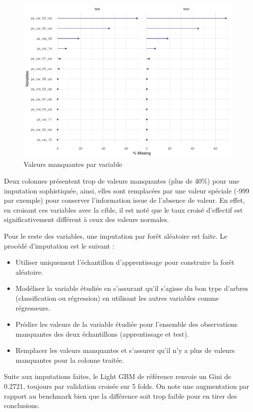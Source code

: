 \documentclass[french]{article}
\begin{document}
\begin{multicols}{2}
\begin{figure}[H] \centering
  \includegraphics[width = \columnwidth]{img/missing_values}
  \caption{Valeurs manquantes par variable}
\end{figure}


Deux colonnes présentent trop de valeurs manquantes (plus de 40\%) pour une imputation sophistiquée, ainsi, elles sont remplacées par une valeur spéciale (-999 par exemple) pour conserver l'information issue de l'absence de valeur. En effet, en croisant ces variables avec la cible, il est noté que le taux croisé d'effectif est significativement différent à ceux des valeurs normales.

Pour le reste des variables, une imputation par forêt aléatoire est faite. Le procédé d'imputation est le suivant :
\begin{itemize}
    \item Utiliser uniquement l'échantillon d'apprentissage pour construire la forêt aléatoire.
    \item Modéliser la variable étudiée en s'assurant qu'il s'agisse du bon type d'arbres (classification ou régression) en utilisant les autres variables comme régresseurs.
    \item Prédire les valeurs de la variable étudiée pour l'ensemble des observations manquantes des deux échantillons (apprentissage et test).
    \item Remplacer les valeurs manquantes et s'assurer qu'il n'y a plus de valeurs manquantes pour la colonne traitée.
\end{itemize}

Suite aux imputations faites, le Light GBM de référence renvoie un Gini de 0.2721, toujours par validation croisée sur 5 folds. On note une augmentation par rapport au benchmark bien que la différence soit trop faible pour en tirer des conclusions.


\end{multicols}
\end{document}
